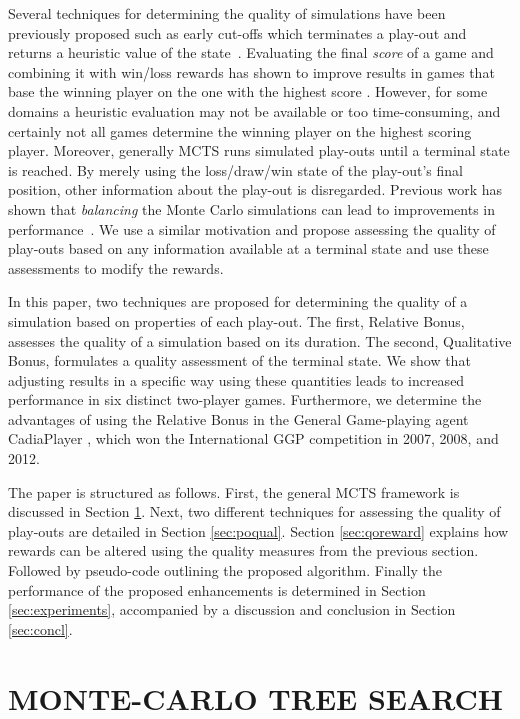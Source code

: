 \documentclass{ecai2014}
\begin{document}
Several techniques for determining the quality of simulations have been previously proposed such as early cut-offs which terminates a play-out and returns a heuristic value of the state~\cite{Winands2011}. Evaluating the final \emph{score} of a game and combining it with win/loss rewards has shown to improve results in games that base the winning player on the one with the highest score \cite{shibahara2008combining}. However, for some domains a heuristic evaluation may not be available or too time-consuming, and certainly not all games determine the winning player on the highest scoring player. Moreover, generally MCTS runs simulated play-outs until a terminal state is reached. By merely using the loss/draw/win state of the play-out's final position, other information about the play-out is disregarded. 
Previous work has shown that {\it balancing} the Monte Carlo simulations can lead to improvements in performance~\cite{silver09monte,huang11monte}. 
We use a similar motivation and propose assessing the quality of play-outs based on any information available at a terminal state and use these assessments to 
modify the rewards. 

In this paper, two techniques are proposed for determining the quality of a simulation based on properties of each play-out. The first, Relative Bonus, assesses the quality of a simulation based on its duration. The second, Qualitative Bonus, formulates a quality assessment of the terminal state. We show that adjusting results in a specific way using these quantities leads to increased performance in six distinct two-player games. Furthermore, we determine the advantages of using the Relative Bonus in the General Game-playing agent {\sc CadiaPlayer} \cite{bjornsson2009cadiaplayer}, which won the International GGP competition in 2007, 2008, and 2012.

The paper is structured as follows. First, the general MCTS framework is discussed in Section \ref{sec:mcts}. Next, two different techniques for assessing the quality of play-outs are detailed in Section \ref{sec:poqual}. Section \ref{sec:qoreward} explains how rewards can be altered using the quality measures from the previous section. Followed by pseudo-code outlining the proposed algorithm. Finally the performance of the proposed enhancements is determined in Section \ref{sec:experiments}, accompanied by a discussion and conclusion in Section \ref{sec:concl}.

\section{MONTE-CARLO TREE SEARCH}
\label{sec:mcts}
\end{document}

